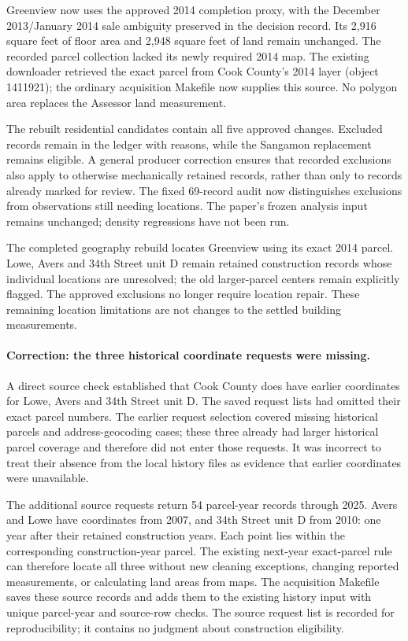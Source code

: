 Greenview now uses the approved 2014 completion proxy, with the December 2013/January 2014 sale ambiguity preserved in the decision record. Its 2,916 square feet of floor area and 2,948 square feet of land remain unchanged. The recorded parcel collection lacked its newly required 2014 map. The existing downloader retrieved the exact parcel from Cook County's 2014 layer (object 1411921); the ordinary acquisition Makefile now supplies this source. No polygon area replaces the Assessor land measurement.

The rebuilt residential candidates contain all five approved changes. Excluded records remain in the ledger with reasons, while the Sangamon replacement remains eligible. A general producer correction ensures that recorded exclusions also apply to otherwise mechanically retained records, rather than only to records already marked for review. The fixed 69-record audit now distinguishes exclusions from observations still needing locations. The paper's frozen analysis input remains unchanged; density regressions have not been run.

The completed geography rebuild locates Greenview using its exact 2014 parcel. Lowe, Avers and 34th Street unit D remain retained construction records whose individual locations are unresolved; the old larger-parcel centers remain explicitly flagged. The approved exclusions no longer require location repair. These remaining location limitations are not changes to the settled building measurements.


\clearpage
\paragraph{Correction: the three historical coordinate requests were missing.}
A direct source check established that Cook County does have earlier coordinates for Lowe, Avers and 34th Street unit D. The saved request lists had omitted their exact parcel numbers. The earlier request selection covered missing historical parcels and address-geocoding cases; these three already had larger historical parcel coverage and therefore did not enter those requests. It was incorrect to treat their absence from the local history files as evidence that earlier coordinates were unavailable.

The additional source requests return 54 parcel-year records through 2025. Avers and Lowe have coordinates from 2007, and 34th Street unit D from 2010: one year after their retained construction years. Each point lies within the corresponding construction-year parcel. The existing next-year exact-parcel rule can therefore locate all three without new cleaning exceptions, changing reported measurements, or calculating land areas from maps. The acquisition Makefile saves these source records and adds them to the existing history input with unique parcel-year and source-row checks. The source request list is recorded for reproducibility; it contains no judgment about construction eligibility.

